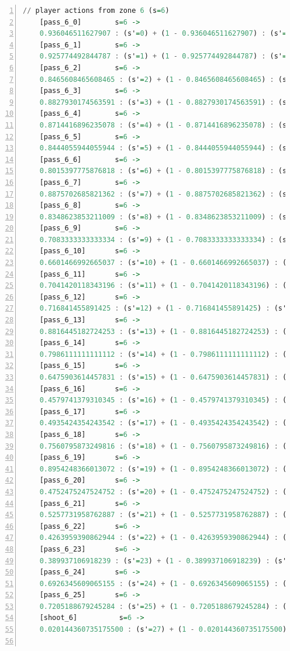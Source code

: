 \documentclass{l4proj}
\begin{document}
\begin{appendices}
\begin{lstlisting}[language=Haskell, numbers=left, caption=MDP used for strategy generation. This is the model specification as-is after the refinements at the end of chapter 3.]
	// player actions from zone 6 (s=6)
	[pass_6_0]	      s=6 ->
	0.936046511627907 : (s'=0) + (1 - 0.936046511627907) : (s'=26);
	[pass_6_1]	      s=6 ->
	0.925774492844787 : (s'=1) + (1 - 0.925774492844787) : (s'=26);
	[pass_6_2]	      s=6 ->
	0.8465608465608465 : (s'=2) + (1 - 0.8465608465608465) : (s'=26);
	[pass_6_3]	      s=6 ->
	0.8827930174563591 : (s'=3) + (1 - 0.8827930174563591) : (s'=26);
	[pass_6_4]	      s=6 ->
	0.8714416896235078 : (s'=4) + (1 - 0.8714416896235078) : (s'=26);
	[pass_6_5]	      s=6 ->
	0.8444055944055944 : (s'=5) + (1 - 0.8444055944055944) : (s'=26);
	[pass_6_6]	      s=6 ->
	0.8015397775876818 : (s'=6) + (1 - 0.8015397775876818) : (s'=26);
	[pass_6_7]	      s=6 ->
	0.8875702685821362 : (s'=7) + (1 - 0.8875702685821362) : (s'=26);
	[pass_6_8]	      s=6 ->
	0.8348623853211009 : (s'=8) + (1 - 0.8348623853211009) : (s'=26);
	[pass_6_9]	      s=6 ->
	0.7083333333333334 : (s'=9) + (1 - 0.7083333333333334) : (s'=26);
	[pass_6_10]	      s=6 ->
	0.6601466992665037 : (s'=10) + (1 - 0.6601466992665037) : (s'=26);
	[pass_6_11]	      s=6 ->
	0.7041420118343196 : (s'=11) + (1 - 0.7041420118343196) : (s'=26);
	[pass_6_12]	      s=6 ->
	0.716841455891425 : (s'=12) + (1 - 0.716841455891425) : (s'=26);
	[pass_6_13]	      s=6 ->
	0.8816445182724253 : (s'=13) + (1 - 0.8816445182724253) : (s'=26);
	[pass_6_14]	      s=6 ->
	0.7986111111111112 : (s'=14) + (1 - 0.7986111111111112) : (s'=26);
	[pass_6_15]	      s=6 ->
	0.6475903614457831 : (s'=15) + (1 - 0.6475903614457831) : (s'=26);
	[pass_6_16]	      s=6 ->
	0.4579741379310345 : (s'=16) + (1 - 0.4579741379310345) : (s'=26);
	[pass_6_17]	      s=6 ->
	0.4935424354243542 : (s'=17) + (1 - 0.4935424354243542) : (s'=26);
	[pass_6_18]	      s=6 ->
	0.7560795873249816 : (s'=18) + (1 - 0.7560795873249816) : (s'=26);
	[pass_6_19]	      s=6 ->
	0.8954248366013072 : (s'=19) + (1 - 0.8954248366013072) : (s'=26);
	[pass_6_20]	      s=6 ->
	0.4752475247524752 : (s'=20) + (1 - 0.4752475247524752) : (s'=26);
	[pass_6_21]	      s=6 ->
	0.5257731958762887 : (s'=21) + (1 - 0.5257731958762887) : (s'=26);
	[pass_6_22]	      s=6 ->
	0.4263959390862944 : (s'=22) + (1 - 0.4263959390862944) : (s'=26);
	[pass_6_23]	      s=6 ->
	0.389937106918239 : (s'=23) + (1 - 0.389937106918239) : (s'=26);
	[pass_6_24]	      s=6 ->
	0.6926345609065155 : (s'=24) + (1 - 0.6926345609065155) : (s'=26);
	[pass_6_25]	      s=6 ->
	0.7205188679245284 : (s'=25) + (1 - 0.7205188679245284) : (s'=26);
	[shoot_6]	       s=6 ->
	0.020144360735175500 : (s'=27) + (1 - 0.020144360735175500) : (s'=26);


\end{lstlisting}
\end{appendices}
\end{document}
